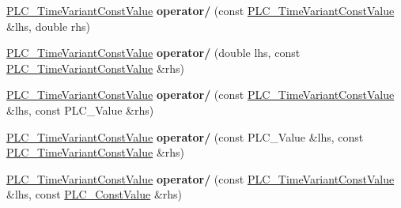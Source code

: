 \begin{DoxyCompactItemize}
\item 
\hypertarget{classns3_1_1PLC__TimeVariantConstValue_a2da6dff602ad810abfc6ad36f97a03e9}{\hyperlink{classns3_1_1PLC__TimeVariantConstValue}{\-P\-L\-C\-\_\-\-Time\-Variant\-Const\-Value} {\bfseries operator/} (const \hyperlink{classns3_1_1PLC__TimeVariantConstValue}{\-P\-L\-C\-\_\-\-Time\-Variant\-Const\-Value} \&lhs, double rhs)}\label{classns3_1_1PLC__TimeVariantConstValue_a2da6dff602ad810abfc6ad36f97a03e9}

\item 
\hypertarget{classns3_1_1PLC__TimeVariantConstValue_af87086ed3949a5554f28f50ee37ae680}{\hyperlink{classns3_1_1PLC__TimeVariantConstValue}{\-P\-L\-C\-\_\-\-Time\-Variant\-Const\-Value} {\bfseries operator/} (double lhs, const \hyperlink{classns3_1_1PLC__TimeVariantConstValue}{\-P\-L\-C\-\_\-\-Time\-Variant\-Const\-Value} \&rhs)}\label{classns3_1_1PLC__TimeVariantConstValue_af87086ed3949a5554f28f50ee37ae680}

\item 
\hypertarget{classns3_1_1PLC__TimeVariantConstValue_acc25d4747ff38d47e54d6addc570943b}{\hyperlink{classns3_1_1PLC__TimeVariantConstValue}{\-P\-L\-C\-\_\-\-Time\-Variant\-Const\-Value} {\bfseries operator/} (const \hyperlink{classns3_1_1PLC__TimeVariantConstValue}{\-P\-L\-C\-\_\-\-Time\-Variant\-Const\-Value} \&lhs, const \-P\-L\-C\-\_\-\-Value \&rhs)}\label{classns3_1_1PLC__TimeVariantConstValue_acc25d4747ff38d47e54d6addc570943b}

\item 
\hypertarget{classns3_1_1PLC__TimeVariantConstValue_ac46c54b4554932ecda94d77fdeec121e}{\hyperlink{classns3_1_1PLC__TimeVariantConstValue}{\-P\-L\-C\-\_\-\-Time\-Variant\-Const\-Value} {\bfseries operator/} (const \-P\-L\-C\-\_\-\-Value \&lhs, const \hyperlink{classns3_1_1PLC__TimeVariantConstValue}{\-P\-L\-C\-\_\-\-Time\-Variant\-Const\-Value} \&rhs)}\label{classns3_1_1PLC__TimeVariantConstValue_ac46c54b4554932ecda94d77fdeec121e}

\item 
\hypertarget{classns3_1_1PLC__TimeVariantConstValue_a6e3f0095d4bc9360aefec297a791e3ff}{\hyperlink{classns3_1_1PLC__TimeVariantConstValue}{\-P\-L\-C\-\_\-\-Time\-Variant\-Const\-Value} {\bfseries operator/} (const \hyperlink{classns3_1_1PLC__TimeVariantConstValue}{\-P\-L\-C\-\_\-\-Time\-Variant\-Const\-Value} \&lhs, const \hyperlink{classns3_1_1PLC__ConstValue}{\-P\-L\-C\-\_\-\-Const\-Value} \&rhs)}\label{classns3_1_1PLC__TimeVariantConstValue_a6e3f0095d4bc9360aefec297a791e3ff}


\end{DoxyCompactItemize}
